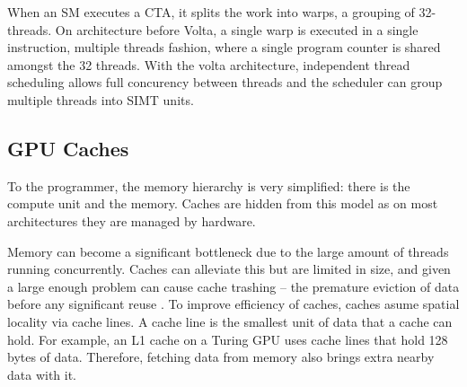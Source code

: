 When an SM executes a CTA, it splits the work into warps, a grouping of 32-threads.
On architecture before Volta, a single warp is executed in a single instruction, multiple threads fashion, where a single program counter is shared amongst the 32 threads.
With the volta architecture, independent thread scheduling allows full concurency between threads and the scheduler can group multiple threads into SIMT units.



\begin{figure}[!hb]
    \centering
    \caption{
    }
\end{figure}


\begin{figure}[!hb]
    \centering
    \caption{
    }
\end{figure}

\subsection{GPU Caches}
\label{sec:cache_gpu}
To the programmer, the memory hierarchy is very simplified: there is the compute unit and the memory.
Caches are hidden from this model as on most architectures they are managed by hardware.

Memory can become a significant bottleneck due to the large amount of threads running concurrently.
Caches can alleviate this but are limited in size, and given a large enough problem can cause cache trashing -- the premature eviction of data before any significant reuse \cite{dai2016model}.
To improve efficiency of caches, caches asume spatial locality via cache lines.
A cache line is the smallest unit of data that a cache can hold.
For example, an L1 cache on a Turing GPU uses cache lines that hold 128 bytes of data.
Therefore, fetching data from memory also brings extra nearby data with it.

